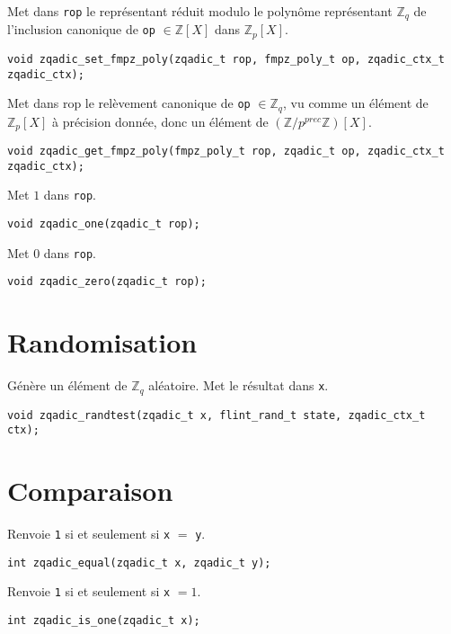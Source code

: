 \documentclass[11pt]{article}
\begin{document}
Met dans \texttt{rop} le représentant réduit modulo le polynôme représentant $\mathbb{Z}_q$ de l'inclusion canonique de \texttt{op} $\in \mathbb{Z}[X]$ dans $\mathbb{Z}_p[X]$. 
\begin{verbatim}
void zqadic_set_fmpz_poly(zqadic_t rop, fmpz_poly_t op, zqadic_ctx_t zqadic_ctx);
\end{verbatim}

Met dans rop le relèvement canonique de \texttt{op} $\in \mathbb{Z}_q$, vu comme un élément de $\mathbb{Z}_p[X]$ à précision donnée, donc un élément de $(\mathbb{Z}/p^{prec} \mathbb{Z})[X]$. 
\begin{verbatim}
void zqadic_get_fmpz_poly(fmpz_poly_t rop, zqadic_t op, zqadic_ctx_t zqadic_ctx);
\end{verbatim}

Met $1$ dans \texttt{rop}. 
\begin{verbatim}
void zqadic_one(zqadic_t rop);
\end{verbatim}

Met $0$ dans \texttt{rop}. 
\begin{verbatim}
void zqadic_zero(zqadic_t rop);
\end{verbatim}


\section{Randomisation}

Génère un élément de $\mathbb{Z}_q$ aléatoire. Met le résultat dans \texttt{x}. 
\begin{verbatim}
void zqadic_randtest(zqadic_t x, flint_rand_t state, zqadic_ctx_t ctx);
\end{verbatim}


\section{Comparaison}

Renvoie \texttt{1} si et seulement si \texttt{x} $=$ \texttt{y}. 
\begin{verbatim}
int zqadic_equal(zqadic_t x, zqadic_t y);
\end{verbatim}

Renvoie \texttt{1} si et seulement si \texttt{x} $= 1$. 
\begin{verbatim}
int zqadic_is_one(zqadic_t x);
\end{verbatim}
\end{document}
